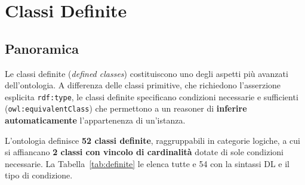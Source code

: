 \section{Classi Definite}
\label{sec:classi_definite}

\subsection{Panoramica}

Le classi definite (\textit{defined classes}) costituiscono uno degli aspetti
pi\`u avanzati dell'ontologia. A differenza delle classi primitive, che richiedono
l'asserzione esplicita \texttt{rdf:type}, le classi definite specificano
condizioni necessarie e sufficienti (\texttt{owl:equivalentClass}) che permettono
a un reasoner di \textbf{inferire automaticamente} l'appartenenza di un'istanza.

L'ontologia definisce \textbf{52 classi definite}, raggruppabili in categorie
logiche, a cui si affiancano \textbf{2 classi con vincolo di cardinalit\`a} dotate di
sole condizioni necessarie. La Tabella~\ref{tab:definite} le elenca tutte e 54 con la
sintassi DL e il tipo di condizione.

